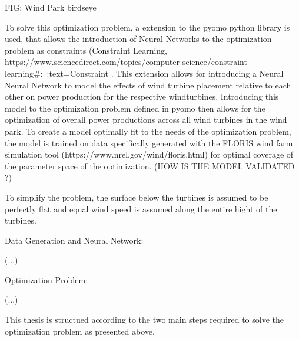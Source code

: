 FIG: Wind Park birdseye

To solve this optimization problem, a extension to the pyomo python library is used, that allows the introduction of Neural Networks to the optimization problem as constraints (Constraint Learning, https://www.sciencedirect.com/topics/computer-science/constraint-learning#:~:text=Constraint%
. This extension allows for introducing a Neural Neural Network to model the effects of wind turbine placement relative to each other on power production for the respective windturbines. Introducing this model to the optimization problem defined in pyomo then allows for the optimization of overall power productions across all wind turbines in the wind park. To create a model optimally fit to the needs of the optimization problem, the model is trained on data specifically generated with the FLORIS wind farm simulation tool (https://www.nrel.gov/wind/floris.html) for optimal coverage of the parameter space of the optimization. (HOW IS THE MODEL VALIDATED ?)

To simplify the problem, the surface below the turbines is assumed to be perfectly flat and equal wind speed is assumed along the entire hight of the turbines. 

Data Generation and Neural Network: 

(...)

Optimization Problem: 

(...)


This thesis is structued according to the two main steps required to solve the optimization problem as presented above.









